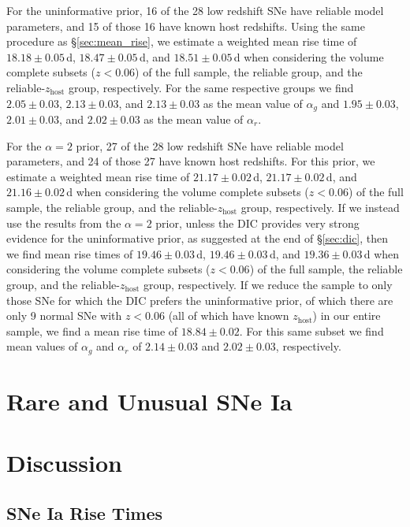 \documentclass[twocolumn]{./aastex63}
\begin{document}
For the uninformative prior, 16 of the 28 low redshift SNe have reliable model
parameters, and 15 of those 16 have known host redshifts. Using the same
procedure as \S\ref{sec:mean_rise}, we estimate a weighted mean rise time of
$18.18 \pm 0.05$\,d, $18.47 \pm 0.05$\,d, and $18.51 \pm 0.05$\,d when
considering the volume complete subsets ($z < 0.06$) of the full sample, the
reliable group, and the reliable-$z_\mathrm{host}$ group, respectively. For
the same respective groups we find $2.05 \pm 0.03$, $2.13 \pm 0.03$, and $2.13
\pm 0.03$ as the mean value of $\alpha_g$ and $1.95 \pm 0.03$, $2.01 \pm
0.03$, and $2.02 \pm 0.03$ as the mean value of $\alpha_r$.

For the $\alpha = 2$ prior, 27 of the 28 low redshift SNe have reliable model
parameters, and 24 of those 27 have known host redshifts. For this prior, we
estimate a weighted mean rise time of $21.17 \pm 0.02$\,d, $21.17 \pm
0.02$\,d, and $21.16 \pm 0.02$\,d when considering the volume complete subsets
($z < 0.06$) of the full sample, the reliable group, and the
reliable-$z_\mathrm{host}$ group, respectively. If we instead use the results
from the $\alpha = 2$ prior, unless the DIC provides very strong evidence for
the uninformative prior, as suggested at the end of \S\ref{sec:dic}, then we
find mean rise times of $19.46 \pm 0.03$\,d, $19.46 \pm 0.03$\,d, and $19.36
\pm 0.03$\,d when considering the volume complete subsets ($z < 0.06$) of the
full sample, the reliable group, and the reliable-$z_\mathrm{host}$ group,
respectively. If we reduce the sample to only those SNe for which the DIC
prefers the uninformative prior, of which there are only 9 normal SNe with $z
< 0.06$ (all of which have known $z_\mathrm{host}$) in our entire sample, we
find a mean rise time of $18.84 \pm 0.02$. For this same subset we find mean
values of $\alpha_g$ and $\alpha_r$ of $2.14 \pm 0.03$ and $2.02 \pm 0.03$,
respectively.

\section{Rare and Unusual SNe Ia}

\section{Discussion}

\subsection{SNe Ia Rise Times}
\end{document}
